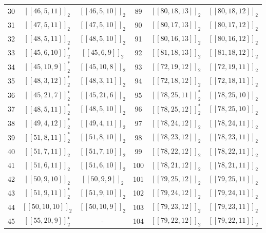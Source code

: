 \documentclass[journal]{IEEEtran}
\begin{document}
\begin{table}[!t]
\begin{threeparttable}
\begin{tabular}{cccccc}
			30  &     $[[46,5,11]]_2$     &        $[[46,5,10]]_2$        & 89  &    $[[80,18,13]]_2$     &       $[[80,18,12]]_2$        \\
			31  &     $[[47,5,11]]_2$     &        $[[47,5,10]]_2$        & 90  &    $[[80,17,13]]_2$     &       $[[80,17,12]]_2$        \\
			32  &     $[[48,5,11]]_2$     &        $[[48,5,10]]_2$        & 91  &    $[[80,16,13]]_2$     &       $[[80,16,12]]_2$        \\
			33  &    $[[45,6,10]]_2^*$    &        $[[45,6,9]]_2$         & 92  &    $[[81,18,13]]_2$     &       $[[81,18,12]]_2$        \\
			34  &    $[[45,10,9]]_2^*$    &        $[[45,10,8]]_2$        & 93  &    $[[72,19,12]]_2$     &       $[[72,19,11]]_2$        \\
			35  &    $[[48,3,12]]_2^*$    &        $[[48,3,11]]_2$        & 94  &    $[[72,18,12]]_2$     &       $[[72,18,11]]_2$        \\
			36  & $[[45,21,7]]_2^{\star}$ &        $[[45,21,6]]_2$        & 95  &   $[[78,25,11]]_2^*$    &       $[[78,25,10]]_2$        \\
			37  &    $[[48,5,11]]_2^*$    &        $[[48,5,10]]_2$        & 96  &   $[[78,25,12]]_2^*$    &       $[[78,25,10]]_2$        \\
			38  &    $[[49,4,12]]_2^*$    &        $[[49,4,11]]_2$        & 97  &    $[[78,24,12]]_2$     &       $[[78,24,11]]_2$        \\
			39  &    $[[51,8,11]]_2^*$    &        $[[51,8,10]]_2$        & 98  &    $[[78,23,12]]_2$     &       $[[78,23,11]]_2$        \\
			40  &     $[[51,7,11]]_2$     &        $[[51,7,10]]_2$        & 99  &    $[[78,22,12]]_2$     &       $[[78,22,11]]_2$        \\
			41  &     $[[51,6,11]]_2$     &        $[[51,6,10]]_2$        & 100 &    $[[78,21,12]]_2$     &       $[[78,21,11]]_2$        \\
			42  &     $[[50,9,10]]_2$     &        $[[50,9,9]]_2$         & 101 &    $[[79,25,12]]_2$     &       $[[79,25,11]]_2$        \\
			43  &    $[[51,9,11]]_2^*$    &        $[[51,9,10]]_2$        & 102 &    $[[79,24,12]]_2$     &       $[[79,24,11]]_2$        \\
			44  &    $[[50,10,10]]_2$     &        $[[50,10,9]]_2$        & 103 &    $[[79,23,12]]_2$     &       $[[79,23,11]]_2$        \\
			45  & $[[55,20,9]]_2^{\star}$ &               -               & 104 &    $[[79,22,12]]_2$     &       $[[79,22,11]]_2$        \\

\end{tabular}
\end{threeparttable}
\end{table}
\end{document}
